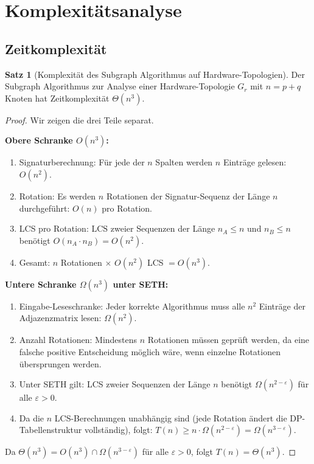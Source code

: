 ﻿\documentclass[a4paper,12pt]{article}
\theoremstyle{definition}
\newtheorem{satz}{Satz}
\begin{document}
\section{Komplexit\"atsanalyse}

\subsection{Zeitkomplexit\"at}

\begin{satz}[Komplexit\"at des Subgraph Algorithmus auf Hardware-Topologien]
  \label{satz:komplex}
  Der Subgraph Algorithmus zur Analyse einer Hardware-Topologie $G_r$
  mit $n = p + q$ Knoten hat Zeitkomplexit\"at $\Theta(n^3)$.
\end{satz}

\begin{proof}
  Wir zeigen die drei Teile separat.

  \textbf{Obere Schranke $O(n^3)$:}
  \begin{enumerate}
    \item Signaturberechnung: F\"ur jede der $n$ Spalten werden $n$ Eintr\"age
          gelesen: $O(n^2)$.
    \item Rotation: Es werden $n$ Rotationen der Signatur-Sequenz der L\"ange $n$
          durchgef\"uhrt: $O(n)$ pro Rotation.
    \item LCS pro Rotation: $\mathrm{LCS}$ zweier Sequenzen der L\"ange $n_A \leq n$
          und $n_B \leq n$ ben\"otigt $O(n_A \cdot n_B) = O(n^2)$.
    \item Gesamt: $n$ Rotationen $\times$ $O(n^2)$ LCS $= O(n^3)$.
  \end{enumerate}

  \textbf{Untere Schranke $\Omega(n^3)$ unter SETH:}
  \begin{enumerate}
    \item Eingabe-Leseschranke: Jeder korrekte Algorithmus muss alle $n^2$
          Eintr\"age der Adjazenzmatrix lesen: $\Omega(n^2)$.
    \item Anzahl Rotationen: Mindestens $n$ Rotationen m\"ussen gepr\"uft werden,
          da eine falsche positive Entscheidung m\"oglich w\"are, wenn einzelne
          Rotationen \"ubersprungen werden.
    \item Unter SETH \cite{abboud2015lcs} gilt: LCS zweier Sequenzen der L\"ange $n$
          ben\"otigt $\Omega(n^{2-\varepsilon})$ f\"ur alle $\varepsilon > 0$.
    \item Da die $n$ LCS-Berechnungen unabh\"angig sind
          (jede Rotation \"andert die DP-Tabellenstruktur vollst\"andig),
          folgt: $T(n) \geq n \cdot \Omega(n^{2-\varepsilon}) = \Omega(n^{3-\varepsilon})$.
  \end{enumerate}
  Da $\Theta(n^3) = O(n^3) \cap \Omega(n^{3-\varepsilon})$ f\"ur alle $\varepsilon > 0$,
  folgt $T(n) = \Theta(n^3)$. \qedhere
\end{proof}
\end{document}
